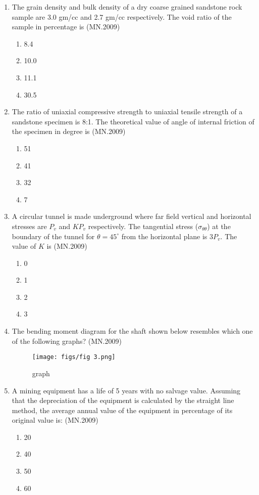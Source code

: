 \documentclass[journal]{IEEEtran}
\numberwithin{equation}{enumi}
\numberwithin{figure}{enumi}
\begin{document}
\begin{enumerate}
    \item The grain density and bulk density of a dry coarse grained sandstone rock sample are 3.0 gm/cc and 2.7 gm/cc respectively. The void ratio of the sample in percentage is
    \hfill{(MN.2009)}
    \begin{enumerate}[label=(\Alph*)]
        \item 8.4
        \item 10.0
        \item 11.1
        \item 30.5
    \end{enumerate}

    \item The ratio of uniaxial compressive strength to uniaxial tensile strength of a sandstone specimen is 8:1. The theoretical value of angle of internal friction of the specimen in degree is
    \hfill{(MN.2009)}
    \begin{enumerate}[label=(\Alph*)]
        \item 51
        \item 41
        \item 32
        \item 7
    \end{enumerate}

    \item A circular tunnel is made underground where far field vertical and horizontal stresses are $P_v$ and $KP_v$ respectively. The tangential stress ($\sigma_{\theta\theta}$) at the boundary of the tunnel for $\theta = 45^\circ$ from the horizontal plane is $3P_v$. The value of $K$ is
    \hfill{(MN.2009)}
    \begin{enumerate}[label=(\Alph*)]
        \item 0
        \item 1
        \item 2
        \item 3
    \end{enumerate}
    
\item The bending moment diagram for the shaft shown below resembles which one of the following graphs?
\hfill{(MN.2009)}
\begin{figure}[H]
    \centering
    \texttt{[image: figs/fig 3.png]}
    \caption{graph}
    \label{fig:placeholder}
\end{figure}

    \item A mining equipment has a life of 5 years with no salvage value. Assuming that the depreciation of the equipment is calculated by the straight line method, the average annual value of the equipment in percentage of its original value is:
    \hfill{(MN.2009)}
    \begin{enumerate}
        \item 20
        \item 40
        \item 50
        \item 60
    \end{enumerate}


\end{enumerate}
\end{document}
